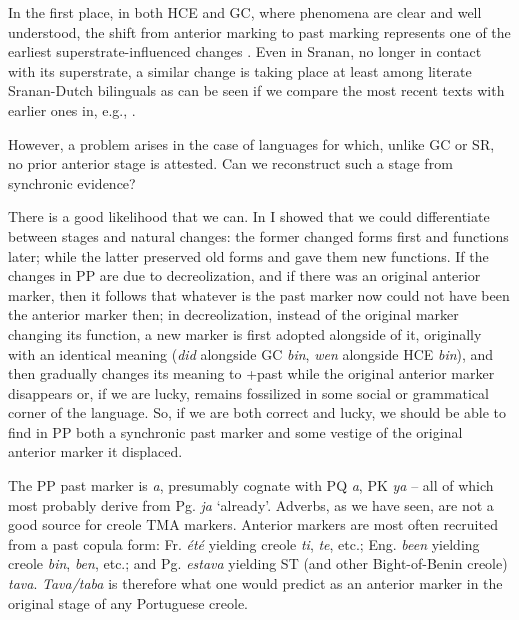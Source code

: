 In the first place, in both HCE and GC, where  phenomena are clear and well understood, the shift from anterior mark\-ing to past marking represents one of the earliest superstrate-influenced changes \citep{Bickerton1975,Bickerton1977}. Even in Sranan, no longer in contact with its superstrate, a similar change is taking place at least among literate Sranan-Dutch bilinguals as can be seen if we compare the most recent texts with earlier ones in, e.g., \citet{Voorhoeve1976}.

However, a problem arises in the case of languages for which, unlike GC or SR, no prior anterior stage is attested. Can we reconstruct such a stage from synchronic evidence?

There is a good likelihood that we can. In \citet{Bickerton1980} I showed that we could differentiate between  stages and natural changes: the former changed forms first and functions later; while the latter preserved old forms and gave them new functions. If the changes in PP are due to decreolization, and if there was an original anterior marker, then it follows that whatever is the past
marker now could not have been the anterior marker then; in decreoli\-zation, instead of the original marker changing its function, a new marker is first adopted alongside of it, originally with an identical meaning (\textit{did} alongside GC \textit{bin}, \textit{wen} alongside HCE \textit{bin}), and then gradually changes its meaning to +past while the original anterior marker disappears or, if we are lucky, remains fossilized in some social or grammatical corner of the language. So, if we are both correct and lucky, we should be able to find in PP both a synchronic past marker and some vestige of the original anterior marker it displaced.

The PP past marker is \textit{a}, presumably cognate with PQ \textit{a}, PK \textit{ya} -- all of which most probably derive from Pg. \textit{ja} `already'. Adverbs, as we have seen, are not a good source for creole TMA markers. Anterior markers are most often recruited from a past copula form: Fr. \textit{été} yielding  creole \textit{ti}, \textit{te}, etc.; Eng. \textit{been} yielding  creole \textit{bin}, \textit{ben}, etc.; and Pg. \textit{estava} yielding ST (and other Bight-of-Benin creole) \textit{tava}. \textit{Tava/taba} is therefore what one would predict as an anterior marker in the original stage of any Portuguese creole.

